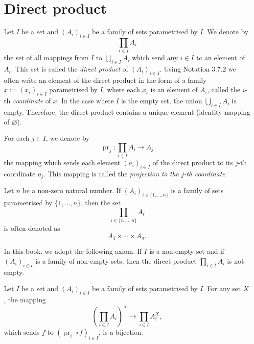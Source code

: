 \documentclass{book}
\begin{document}
\section{Direct product}
\label{sec:direct-product}

\begin{definitionenv}
Let $I$ be a set and $(A_i)_{i \in I}$ be a family of sets parametrised by $I$. We denote by
\[
\prod_{i \in I} A_i
\]
the set of all mappings from $I$ to $\bigcup_{i \in I} A_i$ which send any $i \in I$ to an element of $A_i$. This set is called the \emph{direct product} of $(A_i)_{i \in I}$. Using Notation 3.7.2 we often write an element of the direct product in the form of a family $x := (x_i)_{i \in I}$ parametrised by $I$, where each $x_i$ is an element of $A_i$, called the $i$-th \emph{coordinate} of $x$. In the case where $I$ is the empty set, the union $\bigcup_{i \in I} A_i$ is empty. Therefore, the direct product contains a unique element (identity mapping of $\varnothing$).

For each $j \in I$, we denote by
\[
\operatorname{pr}_j : \prod_{i \in I} A_i \longrightarrow A_j
\]
the mapping which sends each element $(a_i)_{i \in I}$ of the direct product to its $j$-th coordinate $a_j$. This mapping is called the \emph{projection to the $j$-th coordinate}.
\end{definitionenv}

\begin{notationenv}
Let $n$ be a non-zero natural number. If $(A_i)_{i \in \{1, \ldots, n\}}$ is a family of sets parametrised by $\{1, \ldots, n\}$, then the set
\[
\prod_{i \in \{1, \ldots, n\}} A_i
\]
is often denoted as
\[
A_1 \times \cdots \times A_n.
\]
\end{notationenv}

\begin{axiomenv}
In this book, we adopt the following axiom. If $I$ is a non-empty set and if $(A_i)_{i \in I}$ is a family of non-empty sets, then the direct product $\prod_{i \in I} A_i$ is not empty.
\end{axiomenv}
\begin{propositionenv}
\label{prop:direct-product-bijection}
Let $I$ be a set and $(A_i)_{i \in I}$ be a family of sets parametrised by $I$. For any set $X$, the mapping
\[
\left( \prod_{i \in I} A_i \right)^X \longrightarrow \prod_{i \in I} A_i^X,
\]
which sends $f$ to $(\operatorname{pr}_i \circ f)_{i \in I}$, is a bijection.
\end{propositionenv}
\end{document}
